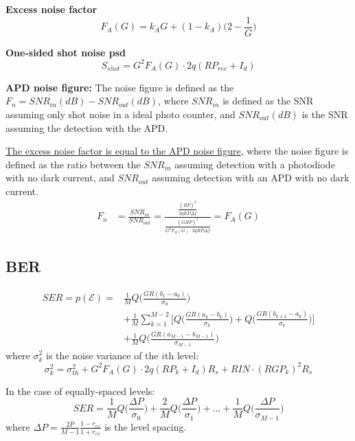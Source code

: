 \documentclass[a4paper]{article}
\begin{document}
\textbf{Excess noise factor}
\begin{equation}
F_A(G) = k_AG + (1-k_A)\Big(2 - \frac{1}{G}\Big)
\end{equation}

\textbf{One-sided shot noise psd}
\begin{equation}
S_{shot} = G^2F_A(G)\cdot 2q(RP_{rec} + I_d)
\end{equation}

\textbf{APD noise figure:} The noise figure is defined as the $F_n = SNR_{in}(dB) - SNR_{out}(dB)$, where $SNR_{in}$ is defined as the SNR assuming only shot noise in a ideal photo counter, and $SNR_{out}(dB)$ is the SNR assuming the detection with the APD.

\underline{The excess noise factor is equal to the APD noise figure}, where the noise figure is defined as the ratio between the $SNR_{in}$ assuming detection with a photodiode with no dark current, and $SNR_{out}$ assuming detection with an APD with no dark current.
\begin{align}
F_n &= \frac{SNR_{in}}{SNR_{out}} = \frac{\frac{(R\bar{P})^2}{2qR\bar{P}\Delta f}}{\frac{(GR\bar{P})^2}{G^2F_A(G)\cdot 2qR\bar{P}\Delta f}} = F_A(G)
\end{align}

\subsection{BER}

\begin{align} \label{eq:error-prob} \nonumber
SER = p(\mathcal{E}) = &\frac{1}{M}Q\bigg(\frac{GR(b_1 - a_0)}{\sigma_{0}}\bigg) \\ \nonumber 
& + \frac{1}{M}\sum_{k=1}^{M-2}\Bigg[Q\bigg(\frac{GR(a_k-b_k)}{\sigma_{k}}\bigg) + Q\bigg(\frac{GR(b_{k+1}-a_k)}{\sigma_{k}}\bigg)\Bigg] \\
& + \frac{1}{M}Q\bigg(\frac{GR(a_{M-1}-b_{M-1})}{\sigma_{M-1}}\bigg)
\end{align}
where $\sigma_{k}^2$ is the noise variance of the $i$th level:
\begin{equation}
\sigma_{k}^2 = \sigma_{th}^2 + G^2F_A(G)\cdot 2q(RP_{k} + I_d)R_s + RIN\cdot (RGP_{k})^2R_s 
\end{equation}


In the case of equally-spaced levels:
\begin{equation}
SER = \frac{1}{M}Q\bigg(\frac{\Delta P}{\sigma_{0}}\bigg) + \frac{2}{M}Q\bigg(\frac{\Delta P}{\sigma_{1}}\bigg) + \ldots + \frac{1}{M}Q\bigg(\frac{\Delta P}{\sigma_{M-1}}\bigg)
\end{equation}
where $\Delta P = \frac{2\bar{P}}{M-1}\frac{1-r_{ex}}{1 + r_{ex}}$ is the level spacing.
\end{document}
